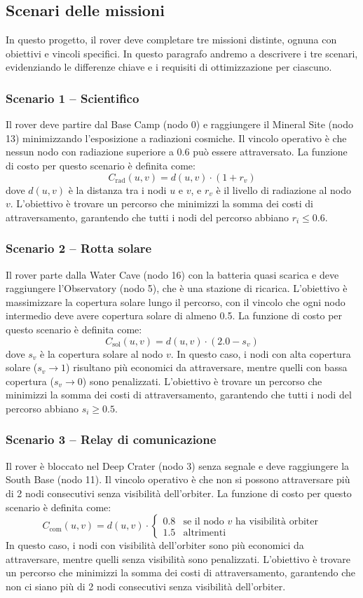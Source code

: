 \documentclass[11pt,a4paper]{article}
\begin{document}
\subsection{Scenari delle missioni}
In questo progetto, il rover deve completare tre missioni distinte, ognuna con obiettivi e vincoli specifici. In questo 
paragrafo andremo a descrivere i tre scenari, evidenziando le differenze chiave e i requisiti di ottimizzazione per ciascuno.
\subsubsection{Scenario 1 -- Scientifico}
Il rover deve partire dal Base Camp (nodo 0) e raggiungere il Mineral Site (nodo 13) minimizzando l'esposizione a radiazioni cosmiche. Il vincolo operativo è che nessun nodo con radiazione superiore a 0.6 può essere attraversato.
La funzione di costo per questo scenario è definita come:
\[
  C_{\text{rad}}(u, v) = d(u, v) \cdot (1 + r_v)
\]
dove $d(u, v)$ è la distanza tra i nodi $u$ e $v$, e $r_v$ è il livello di radiazione al nodo $v$. L'obiettivo è trovare un percorso che minimizzi la somma dei costi di attraversamento, garantendo che tutti i nodi del percorso abbiano $r_i \le 0.6$.
\subsubsection{Scenario 2 -- Rotta solare}
Il rover parte dalla Water Cave (nodo 16) con la batteria quasi scarica e deve raggiungere l'Observatory (nodo 5), che è una stazione di ricarica. L'obiettivo è massimizzare la copertura solare lungo il percorso, con il vincolo che ogni nodo intermedio deve avere copertura solare di almeno 0.5.
La funzione di costo per questo scenario è definita come:
\[
  C_{\text{sol}}(u, v) = d(u, v) \cdot (2.0 - s_v)
\]
dove $s_v$ è la copertura solare al nodo $v$. In questo caso, i nodi con alta copertura solare ($s_v \to 1$) risultano più economici da attraversare, mentre quelli con bassa copertura ($s_v \to 0$) sono penalizzati. L'obiettivo è trovare un percorso che minimizzi la somma dei costi di attraversamento, garantendo che tutti i nodi del percorso abbiano $s_i \ge 0.5$.
\subsubsection{Scenario 3 -- Relay di comunicazione}
Il rover è bloccato nel Deep Crater (nodo 3) senza segnale e deve raggiungere la South Base (nodo 11). Il vincolo operativo è che non si possono attraversare più di 2 nodi consecutivi senza visibilità dell'orbiter.
La funzione di costo per questo scenario è definita come:
\[
  C_{\text{com}}(u, v) = d(u, v) \cdot
  \begin{cases}
    0.8 & \text{se il nodo } v \text{ ha visibilità orbiter} \\
    1.5 & \text{altrimenti}
  \end{cases}
\]
In questo caso, i nodi con visibilità dell'orbiter sono più economici da attraversare, mentre quelli senza visibilità sono penalizzati. L'obiettivo è trovare un percorso che minimizzi la somma dei costi di attraversamento, garantendo che non ci siano più di 2 nodi consecutivi senza visibilità dell'orbiter.
\end{document}
